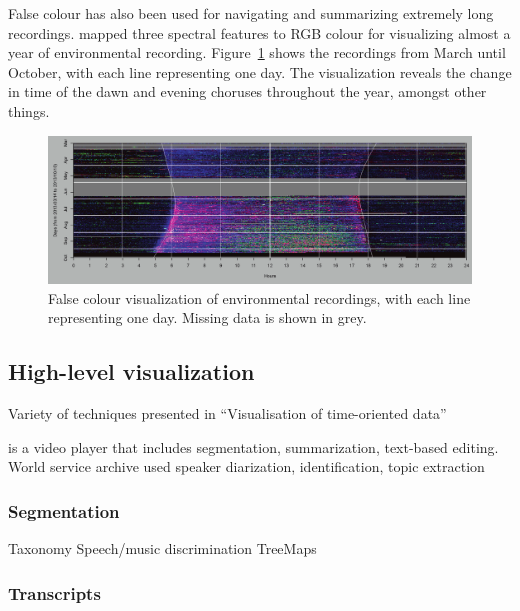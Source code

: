 False colour has also been used for navigating and summarizing extremely long recordings. \citet{Towsey2014} mapped
three spectral features to RGB colour for visualizing almost a year of environmental recording.
Figure~\ref{fig:towsey} shows the recordings from March until October, with each line representing one day.  The
visualization reveals the change in time of the dawn and evening choruses throughout the year, amongst other things.

\begin{figure}[p]
  \centering
  \includegraphics[width=0.95\linewidth]{figs/towsey.png}
  \caption{False colour visualization of environmental recordings, with each line representing one day. Missing data is
    shown in grey.
    \citep{Towsey2014}}
  \label{fig:towsey}
\end{figure}


\subsection{High-level visualization}

Variety of techniques presented in ``Visualisation of time-oriented data'' \citep{Aigner2011}

\citet{Pavel2014} is a video player that includes segmentation, summarization, text-based editing.
World service archive \citep{Raimond2014} used speaker diarization, identification, topic extraction

\subsubsection{Segmentation}

Taxonomy \cite{Avdelidis2007}
Speech/music discrimination \citep{Wieser2014}
TreeMaps \citep{Abdulhamid2013,Abdulhamid2013a}

\subsubsection{Transcripts}\label{sec:background-transcripts}

